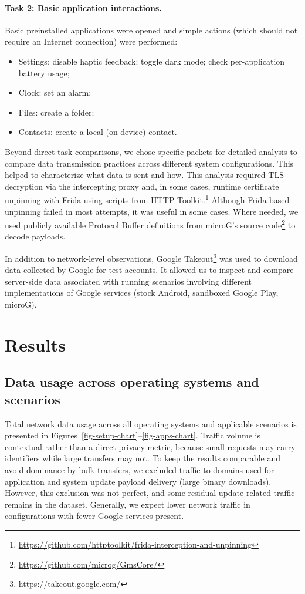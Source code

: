 \documentclass[runningheads]{llncs}
\begin{document}
\paragraph{Task 2: Basic application interactions.}
Basic preinstalled applications were opened and simple actions (which should not require an Internet connection) were performed:
\begin{itemize}
	\item Settings: disable haptic feedback; toggle dark mode; check per-application battery usage;
	\item Clock: set an alarm;
	\item Files: create a folder;
	\item Contacts: create a local (on-device) contact.
\end{itemize}

Beyond direct task comparisons, we chose specific packets for detailed analysis to compare data transmission practices across different system configurations. This helped to characterize what data is sent and how. This analysis required TLS decryption via the intercepting proxy and, in some cases, runtime certificate unpinning with Frida using scripts from HTTP Toolkit.\footnote{\url{https://github.com/httptoolkit/frida-interception-and-unpinning}} Although Frida-based unpinning failed in most attempts, it was useful in some cases. Where needed, we used publicly available Protocol Buffer definitions from microG's source code\footnote{\url{https://github.com/microg/GmsCore/}} to decode payloads.

In addition to network-level observations, Google Takeout\footnote{\url{https://takeout.google.com/}} was used to download data collected by Google for test accounts. It allowed us to inspect and compare server-side data associated with running scenarios involving different implementations of Google services (stock Android, sandboxed Google Play, microG).

\section{Results}

\subsection{Data usage across operating systems and scenarios}

Total network data usage across all operating systems and applicable scenarios is presented in Figures~\ref{fig-setup-chart}--\ref{fig-apps-chart}. Traffic volume is contextual rather than a direct privacy metric, because small requests may carry identifiers while large transfers may not. To keep the results comparable and avoid dominance by bulk transfers, we excluded traffic to domains used for application and system update payload delivery (large binary downloads). However, this exclusion was not perfect, and some residual update-related traffic remains in the dataset. Generally, we expect lower network traffic in configurations with fewer Google services present.
\end{document}
